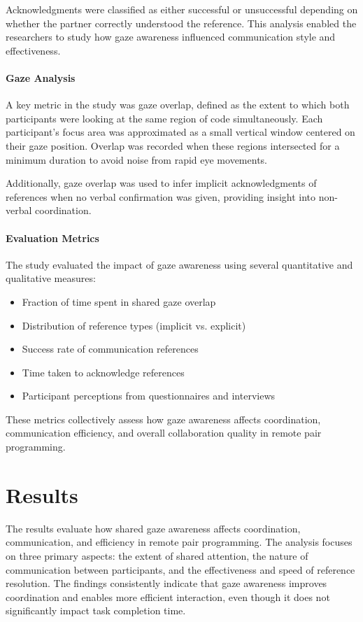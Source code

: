 Acknowledgments were classified as either successful or unsuccessful depending on whether the partner correctly understood the reference. This analysis enabled the researchers to study how gaze awareness influenced communication style and effectiveness.

\paragraph{Gaze Analysis}
A key metric in the study was gaze overlap, defined as the extent to which both participants were looking at the same region of code simultaneously. Each participant’s focus area was approximated as a small vertical window centered on their gaze position. Overlap was recorded when these regions intersected for a minimum duration to avoid noise from rapid eye movements.

Additionally, gaze overlap was used to infer implicit acknowledgments of references when no verbal confirmation was given, providing insight into non-verbal coordination.

\paragraph{Evaluation Metrics}
The study evaluated the impact of gaze awareness using several quantitative and qualitative measures:
\begin{itemize}
    \item Fraction of time spent in shared gaze overlap
    \item Distribution of reference types (implicit vs. explicit)
    \item Success rate of communication references
    \item Time taken to acknowledge references
    \item Participant perceptions from questionnaires and interviews
\end{itemize}
These metrics collectively assess how gaze awareness affects coordination, communication efficiency, and overall collaboration quality in remote pair programming.

\section{Results}
The results evaluate how shared gaze awareness affects coordination, communication, and efficiency in remote pair programming. The analysis focuses on three primary aspects: the extent of shared attention, the nature of communication between participants, and the effectiveness and speed of reference resolution. The findings consistently indicate that gaze awareness improves coordination and enables more efficient interaction, even though it does not significantly impact task completion time.

